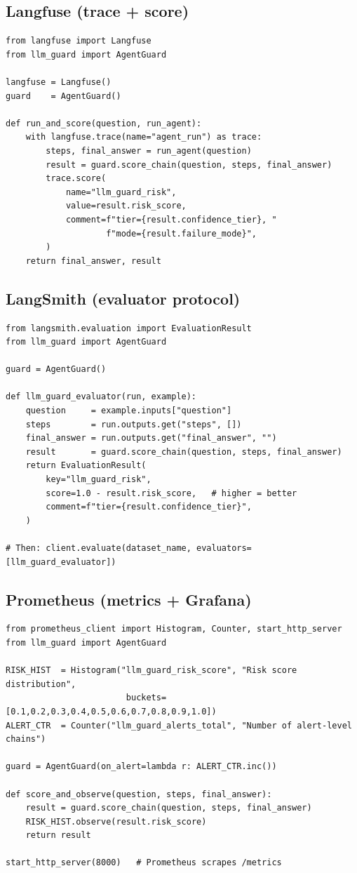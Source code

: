\documentclass[11pt,a4paper]{article}
\begin{document}
\subsection{Langfuse (trace + score)}

\begin{lstlisting}
from langfuse import Langfuse
from llm_guard import AgentGuard

langfuse = Langfuse()
guard    = AgentGuard()

def run_and_score(question, run_agent):
    with langfuse.trace(name="agent_run") as trace:
        steps, final_answer = run_agent(question)
        result = guard.score_chain(question, steps, final_answer)
        trace.score(
            name="llm_guard_risk",
            value=result.risk_score,
            comment=f"tier={result.confidence_tier}, "
                    f"mode={result.failure_mode}",
        )
    return final_answer, result
\end{lstlisting}

\subsection{LangSmith (evaluator protocol)}

\begin{lstlisting}
from langsmith.evaluation import EvaluationResult
from llm_guard import AgentGuard

guard = AgentGuard()

def llm_guard_evaluator(run, example):
    question     = example.inputs["question"]
    steps        = run.outputs.get("steps", [])
    final_answer = run.outputs.get("final_answer", "")
    result       = guard.score_chain(question, steps, final_answer)
    return EvaluationResult(
        key="llm_guard_risk",
        score=1.0 - result.risk_score,   # higher = better
        comment=f"tier={result.confidence_tier}",
    )

# Then: client.evaluate(dataset_name, evaluators=[llm_guard_evaluator])
\end{lstlisting}

\subsection{Prometheus (metrics + Grafana)}

\begin{lstlisting}
from prometheus_client import Histogram, Counter, start_http_server
from llm_guard import AgentGuard

RISK_HIST  = Histogram("llm_guard_risk_score", "Risk score distribution",
                        buckets=[0.1,0.2,0.3,0.4,0.5,0.6,0.7,0.8,0.9,1.0])
ALERT_CTR  = Counter("llm_guard_alerts_total", "Number of alert-level chains")

guard = AgentGuard(on_alert=lambda r: ALERT_CTR.inc())

def score_and_observe(question, steps, final_answer):
    result = guard.score_chain(question, steps, final_answer)
    RISK_HIST.observe(result.risk_score)
    return result

start_http_server(8000)   # Prometheus scrapes /metrics
\end{lstlisting}
\end{document}
